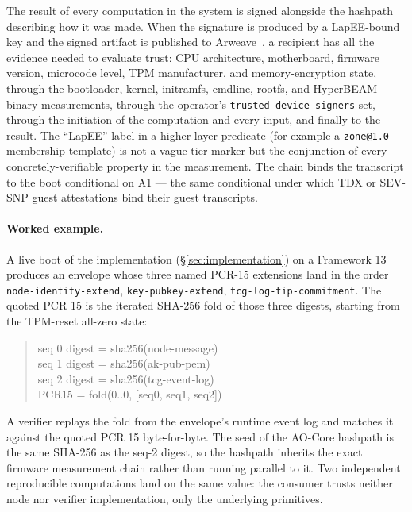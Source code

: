 \documentclass[10pt,a4paper]{article}
\begin{document}
The result of every computation in the system is signed alongside the
hashpath describing how it was made. When the signature is produced by a
LapEE-bound key and the signed artifact is published to
Arweave~\cite{arweave}, a recipient has all the evidence needed to evaluate
trust: CPU architecture, motherboard, firmware version, microcode level,
TPM manufacturer, and memory-encryption state, through the bootloader,
kernel, initramfs, cmdline, rootfs, and HyperBEAM binary measurements,
through the operator's \texttt{trusted-device-signers} set, through the
initiation of the computation and every input, and finally to the result.
The ``LapEE'' label in a higher-layer predicate (for example a
\texttt{zone@1.0} membership template) is not a vague tier marker but
the conjunction of every concretely-verifiable property in the
measurement. The chain binds the transcript to the boot conditional on
A1 --- the same conditional under which TDX or SEV-SNP guest
attestations bind their guest transcripts.

\paragraph{Worked example.} A live boot of the implementation
(\S\ref{sec:implementation}) on a Framework 13 produces an envelope
whose three named PCR-15 extensions land in the order
\texttt{node-identity-extend}, \texttt{key-pubkey-extend},
\texttt{tcg-log-tip-commitment}. The quoted PCR 15 is the iterated
SHA-256 fold of those three digests, starting from the TPM-reset
all-zero state:
\begin{quote}\footnotesize\ttfamily
seq 0  digest = sha256(node-message)\\
seq 1  digest = sha256(ak-pub-pem)\\
seq 2  digest = sha256(tcg-event-log)\\
PCR15  = fold(0..0, [seq0, seq1, seq2])
\end{quote}
A verifier replays the fold from the envelope's runtime event log and
matches it against the quoted PCR 15 byte-for-byte. The seed of the
AO-Core hashpath is the same SHA-256 as the seq-2 digest, so the
hashpath inherits the exact firmware measurement chain rather than
running parallel to it. Two independent reproducible computations land
on the same value: the consumer trusts neither node nor verifier
implementation, only the underlying primitives.
\end{document}
